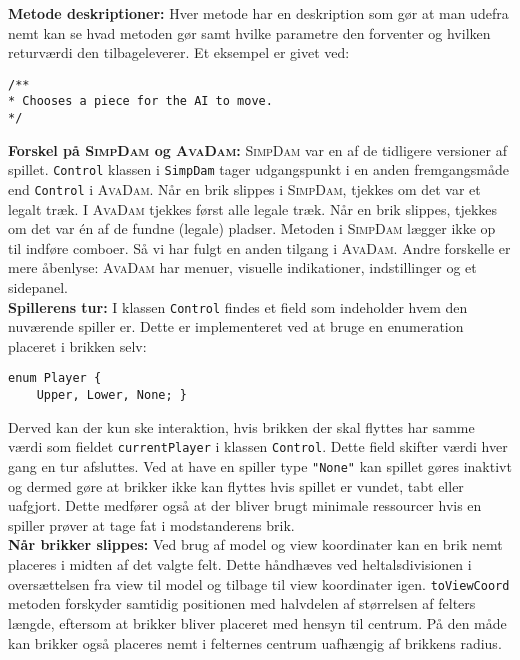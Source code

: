 \textbf{Metode deskriptioner:} 
Hver metode har en deskription som gør at man udefra nemt kan se hvad metoden gør samt hvilke parametre den forventer og hvilken returværdi den tilbageleverer. Et eksempel er givet ved:

\begin{lstlisting}
/**
* Chooses a piece for the AI to move.
*/
\end{lstlisting}

\textbf{Forskel på \textsc{SimpDam} og \textsc{AvaDam}:} 
\textsc{SimpDam} var en af de tidligere versioner af spillet. \texttt{Control} klassen i \texttt{SimpDam} tager udgangspunkt i en anden fremgangsmåde end \texttt{Control} i \textsc{AvaDam}. Når en brik slippes i \textsc{SimpDam}, tjekkes om det var et legalt træk. I \textsc{AvaDam} tjekkes først alle legale træk. Når en brik slippes, tjekkes om det var én af de fundne (legale) pladser. Metoden i \textsc{SimpDam} lægger ikke op til indføre comboer. Så vi har fulgt en anden tilgang i \textsc{AvaDam}. Andre forskelle er mere åbenlyse: \textsc{AvaDam} har  menuer, visuelle indikationer, indstillinger og et sidepanel.\\

\textbf{Spillerens tur:} 
I klassen \texttt{Control} findes et field som indeholder hvem den nuværende spiller er. Dette er implementeret ved at bruge en enumeration placeret i brikken selv: 

\begin{lstlisting}
enum Player {
	Upper, Lower, None; }
\end{lstlisting}

Derved kan der kun ske interaktion, hvis brikken der skal flyttes har samme værdi som fieldet \texttt{currentPlayer} i klassen \texttt{Control}. Dette field skifter værdi hver gang en tur afsluttes. Ved at have en spiller type \texttt{"None"} kan spillet gøres inaktivt og dermed gøre at brikker ikke kan flyttes hvis spillet er vundet, tabt eller uafgjort. Dette medfører også at der bliver brugt minimale ressourcer hvis en spiller prøver at tage fat i modstanderens brik. 
\\

\textbf{Når brikker slippes:} 
Ved brug af model og view koordinater kan en brik nemt placeres i midten af det valgte felt. Dette håndhæves ved heltalsdivisionen i oversættelsen fra view til model og tilbage til view koordinater igen.  \texttt{toViewCoord} metoden forskyder samtidig positionen med halvdelen af størrelsen af felters længde, eftersom at brikker bliver placeret med hensyn til centrum. På den måde kan brikker også placeres nemt i felternes centrum uafhængig af brikkens radius.
\\